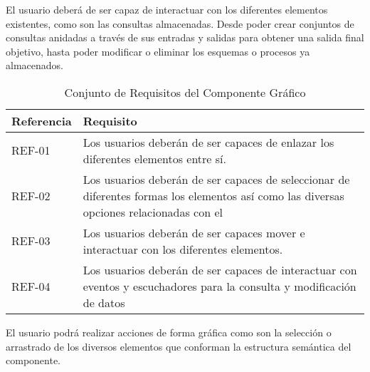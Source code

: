 
El usuario deberá de ser capaz de interactuar con los diferentes elementos existentes, como son las consultas almacenadas. Desde poder crear conjuntos de consultas anidadas a través de sus entradas y salidas para obtener una salida final objetivo, hasta poder modificar o eliminar los esquemas o procesos ya almacenados.

	
\begin{table}[H]
    \begin{center}
	   \begin{tabular}{|l|l|}
					\hline
					Referencia & Requisito \\
					\hline \hline
					REF-01 & Los usuarios deberán de ser capaces de enlazar los diferentes elementos entre sí. \\ \hline					
					REF-02 & Los usuarios deberán de ser capaces de seleccionar de diferentes formas los elementos así como las diversas opciones relacionadas con el \\ \hline					
					REF-03 & Los usuarios deberán de ser capaces mover e interactuar con los diferentes elementos.\\ \hline
					REF-04 & Los usuarios deberán de ser capaces de interactuar con eventos y escuchadores para la consulta y modificación de datos\\ \hline
				\end{tabular}
				\caption{Conjunto de Requisitos del Componente Gráfico}
				\label{tabla:requisitosHerramientaProceso}
			\end{center}
		\end{table}
	
El usuario podrá realizar acciones de forma gráfica como son la selección o arrastrado de los diversos elementos que conforman la estructura semántica del componente.



